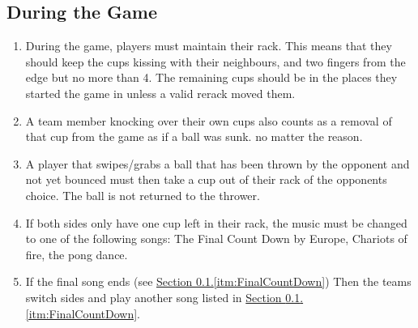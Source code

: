 	\subsection{During the Game}\label{ssec:DuringGame}
		\begin{enumerate}[label=(\roman*), ref=\roman*]
            \item \label{itm:MaintainRack} During the game, players must maintain their rack.
                This means that they should keep the cups kissing with their neighbours, and two fingers from the edge but no more than 4.
                The remaining cups should be in the places they started the game in unless a valid rerack moved them.
            \item \label{itm:Knockover} A team member knocking over their own cups also counts as a removal of that cup from the game as if a ball was sunk. no matter the reason.
            \item \label{itm:swiping_no_bounce} A player that swipes/grabs a ball that has been thrown by the opponent and not yet bounced must then take a cup out of their rack of the opponents choice.
                The ball is not returned to the thrower.
            \item \label{itm:FinalCountDown} If both sides only have one cup left in their rack, the music must be changed to one of the following songs: The Final Count Down by Europe, Chariots of fire, the pong dance.
            \item \label{itm:finalSongEnd} If the final song ends (see \hyperref[itm:FinalCountDown]{Section \ref*{ssec:DuringGame}.\ref*{itm:FinalCountDown}}) Then the teams switch sides and play another song listed in \hyperref[itm:FinalCountDown]{Section \ref*{ssec:DuringGame}.\ref*{itm:FinalCountDown}}.
        \end{enumerate}
